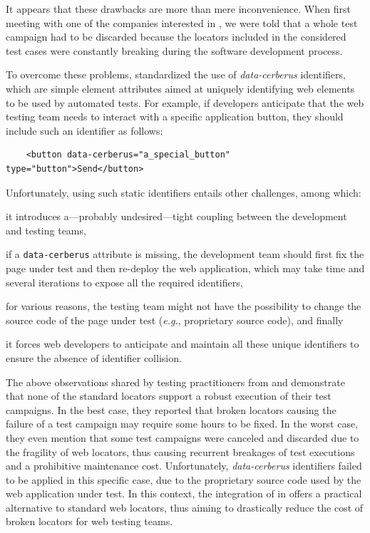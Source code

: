 It appears that these drawbacks are more than mere inconvenience. 
When first meeting with one of the companies interested in \erratum, we were told that a whole test campaign had to be discarded because the locators included in the considered test cases were constantly breaking during the software development process.

To overcome these problems, \cerberus standardized the use of \textit{data-cerberus} identifiers, which are simple element attributes aimed at uniquely identifying web elements to be used by automated tests.
For example, if developers anticipate that the web testing team needs to interact with a specific application button, they should include such an identifier as follows:
 \begin{lstlisting}
    <button data-cerberus="a_special_button" type="button">Send</button>
\end{lstlisting}

Unfortunately, using such static identifiers entails other challenges, among which:
\begin{compactenum}
    \item it introduces a---probably undesired---tight coupling between the development and testing teams,
    \item if a \texttt{data-cerberus} attribute is missing, the development team should first fix the page under test and then re-deploy the web application, which may take time and several iterations to expose all the required identifiers,
    \item for various reasons, the testing team might not have the possibility to change the source code of the page under test (\emph{e.g.}, proprietary source code), and finally
    \item it forces web developers to anticipate and maintain all these unique identifiers to ensure the absence of identifier collision.
\end{compactenum}

The above observations shared by testing practitioners from \laredoute{} and \cerberus demonstrate that none of the standard locators support a robust execution of their test campaigns.
In the best case, they reported that broken locators causing the failure of a test campaign may require some hours to be fixed.
In the worst case, they even mention that some test campaigns were canceled and discarded due to the fragility of web locators, thus causing recurrent breakages of test executions and a prohibitive maintenance cost.
Unfortunately, \textit{data-cerberus} identifiers failed to be applied in this specific case, due to the proprietary source code used by the web application under test.
In this context, the integration of \erratum{} in \cerberus{} offers a practical alternative to standard web locators, thus aiming to drastically reduce the cost of broken locators for web testing teams.

